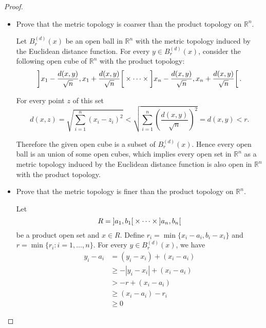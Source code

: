 \begin{proof}
    \begin{itemize}
        \item Prove that the metric topology is coarser than the product topology on $\mathbb{R}^{n}$.

              Let $B^{(d)}_{r}(x)$ be an open ball in $\mathbb{R}^{n}$ with the metric topology induced by the Euclidean distance function. For every $y\in B^{(d)}_{r}(x)$, consider the following open cube of $\mathbb{R}^{n}$ with the product topology:
              \[
                  \left]{x_{1} - \frac{d(x, y)}{\sqrt{n}}, x_{1} + \frac{d(x, y)}{\sqrt{n}}}\right[\times\cdots\times\left]{x_{n} - \frac{d(x, y)}{\sqrt{n}}, x_{n} + \frac{d(x, y)}{\sqrt{n}}}\right[.
              \]

              For every point $z$ of this set
              \[
                  d(x, z) = \sqrt{\sum^{n}_{i=1}{(x_{i} - z_{i})}^{2}} < \sqrt{\sum^{n}_{i=1}{\left(\frac{d(x, y)}{\sqrt{n}}\right)}^{2}} = d(x, y) < r.
              \]

              Therefore the given open cube is a subset of $B^{(d)}_{r}(x)$. Hence every open ball is an union of some open cubes, which implies every open set in $\mathbb{R}^{n}$ as a metric topology induced by the Euclidean distance function is also open in $\mathbb{R}^{n}$ with the product topology.
        \item Prove that the metric topology is finer than the product topology on $\mathbb{R}^{n}$.

              Let
              \[
                  R = \left]{a_{1},b_{1}}\right[ \times\cdots\times \left]{a_{n},b_{n}}\right[
              \]
              be a product open set and $x\in R$. Define $r_{i} = \min\{ x_{i} - a_{i}, b_{i} - x_{i} \}$ and $r = \min\{ r_{i} : i = 1,\ldots, n \}$. For every $y\in B^{(d)}_{r}(x)$, we have
              \begin{align*}
                  y_{i} - a_{i} & = (y_{i} - x_{i}) + (x_{i} - a_{i})                          \\
                                & \geq -\left\vert{y_{i} - x_{i}}\right\vert + (x_{i} - a_{i}) \\
                                & > -r + (x_{i} - a_{i})                                       \\
                                & \geq (x_{i} - a_{i}) - r_{i}                                 \\
                                & \geq 0
              \end{align*}


\end{itemize}
\end{proof}
